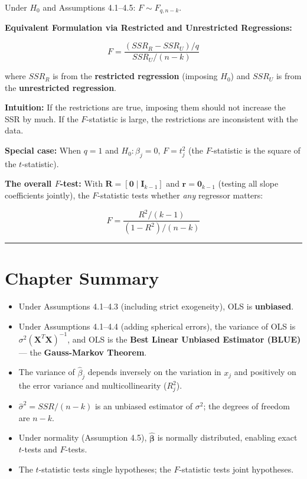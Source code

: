 Under $H_0$ and Assumptions 4.1--4.5: $F \sim F_{q, n-k}$.

\textbf{Equivalent Formulation via Restricted and Unrestricted Regressions:}

\[
F = \frac{(SSR_R - SSR_U)/q}{SSR_U/(n-k)}
\]

where $SSR_R$ is from the \textbf{restricted regression} (imposing $H_0$) and $SSR_U$ is from the \textbf{unrestricted regression}.

\textbf{Intuition:} If the restrictions are true, imposing them should not increase the SSR by much. If the $F$-statistic is large, the restrictions are inconsistent with the data.

\textbf{Special case:} When $q = 1$ and $H_0: \beta_j = 0$, $F = t_j^2$ (the $F$-statistic is the square of the $t$-statistic).

\textbf{The overall $F$-test:} With $\mathbf{R} = [\mathbf{0} \mid \mathbf{I}_{k-1}]$ and $\mathbf{r} = \mathbf{0}_{k-1}$ (testing all slope coefficients jointly), the $F$-statistic tests whether \textit{any} regressor matters:

\[
F = \frac{R^2/(k-1)}{(1-R^2)/(n-k)}
\]

\medskip\hrule\medskip

\section{Chapter Summary}

\begin{itemize}
\item Under Assumptions 4.1--4.3 (including strict exogeneity), OLS is \textbf{unbiased}.
\item Under Assumptions 4.1--4.4 (adding spherical errors), the variance of OLS is $\sigma^2(\mathbf{X}^T\mathbf{X})^{-1}$, and OLS is the \textbf{Best Linear Unbiased Estimator (BLUE)} --- the \textbf{Gauss-Markov Theorem}.
\item The variance of $\hat{\beta}_j$ depends inversely on the variation in $x_j$ and positively on the error variance and multicollinearity ($R^2_j$).
\item $\hat{\sigma}^2 = SSR/(n-k)$ is an unbiased estimator of $\sigma^2$; the degrees of freedom are $n - k$.
\item Under normality (Assumption 4.5), $\hat{\boldsymbol{\beta}}$ is normally distributed, enabling exact $t$-tests and $F$-tests.
\item The $t$-statistic tests single hypotheses; the $F$-statistic tests joint hypotheses.
\end{itemize}

